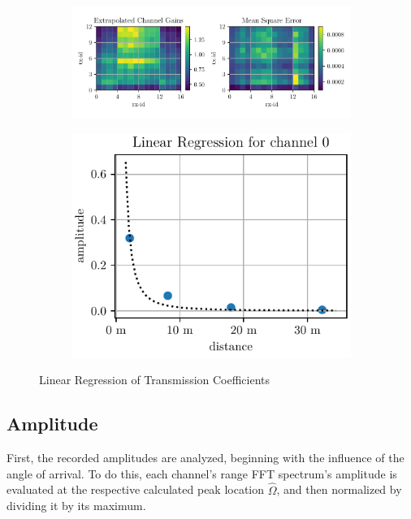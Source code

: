 \begin{figure}
  \centering
  \begin{subfigure}{\textwidth}
    \centering
    \includegraphics[width=\textwidth]{../figures/amplitude_linreg.pdf}
    \label{fig:amp_linreg}
  \end{subfigure}
  \vspace{1cm}
  \begin{subfigure}{0.5\textwidth}
    \centering
    \includegraphics[width=\textwidth]{../figures/ch0_amplitude_linreg.pdf}
    \label{fig:ch0_amp_linreg}
  \end{subfigure}
  \caption{Linear Regression of Transmission Coefficients}
\end{figure}
\subsection{Amplitude}
\label{sec:amplitude}
First, the recorded amplitudes are analyzed, beginning with the influence of the angle of arrival.
To do this, each channel's range FFT spectrum's amplitude is evaluated at the respective calculated peak location $\hat \Omega$,
and then normalized by dividing it by its maximum.

